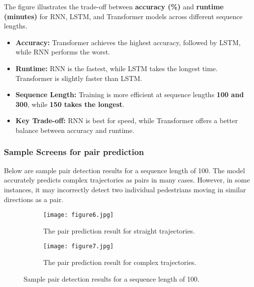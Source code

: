 \documentclass{article}
\begin{document}
The figure illustrates the trade-off between \textbf{accuracy (\%)} and \textbf{runtime (minutes)} for RNN, LSTM, and Transformer models across different sequence lengths.

\begin{itemize}
    \item \textbf{Accuracy:} Transformer achieves the highest accuracy, followed by LSTM, while RNN performs the worst.
    \item \textbf{Runtime:} RNN is the fastest, while LSTM takes the longest time. Transformer is slightly faster than LSTM.
    \item \textbf{Sequence Length:} Training is more efficient at sequence lengths \textbf{100 and 300}, while \textbf{150 takes the longest}.
    \item \textbf{Key Trade-off:} RNN is best for speed, while Transformer offers a better balance between accuracy and runtime.
\end{itemize}


\subsubsection{Sample Screens for pair prediction}

Below are sample pair detection results for a sequence length of 100. The model accurately predicts complex trajectories as pairs in many cases. However, in some instances, it may incorrectly detect two individual pedestrians moving in similar directions as a pair.

\begin{figure}[H]
    \centering
    \ifpdf
        \begin{subfigure}[c]{0.45\textwidth} 
            \centering
            \texttt{[image: figure6.jpg]}
            \caption{The pair prediction result for straight trajectories.}
            \label{fig:pair1}
        \end{subfigure}
    \fi
    \hfill
    \begin{subfigure}[c]{0.45\textwidth}
        \centering
        \texttt{[image: figure7.jpg]}
        \caption{The pair prediction result for complex trajectories.}
        \label{fig:pair2}
    \end{subfigure}

    \caption{Sample pair detection results for a sequence length of 100.}
    \label{fig:pair_prediction}
\end{figure}
\end{document}
